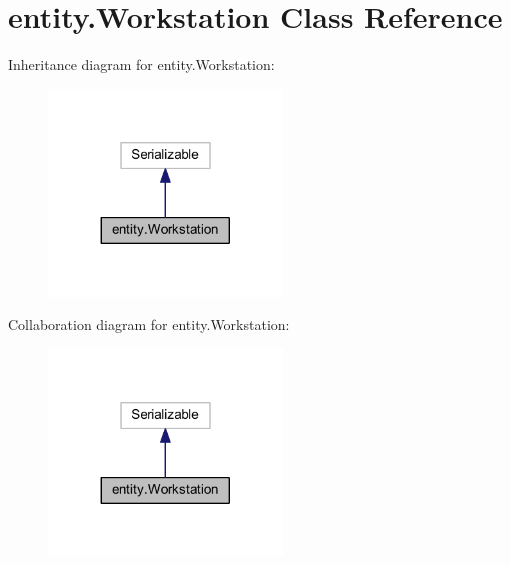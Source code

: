 \hypertarget{classentity_1_1_workstation}{}\section{entity.\+Workstation Class Reference}
\label{classentity_1_1_workstation}


Inheritance diagram for entity.\+Workstation\+:\nopagebreak
\begin{figure}[H]
\begin{center}
\leavevmode
\includegraphics[width=176pt]{classentity_1_1_workstation__inherit__graph}
\end{center}
\end{figure}


Collaboration diagram for entity.\+Workstation\+:\nopagebreak
\begin{figure}[H]
\begin{center}
\leavevmode
\includegraphics[width=176pt]{classentity_1_1_workstation__coll__graph}
\end{center}
\end{figure}
